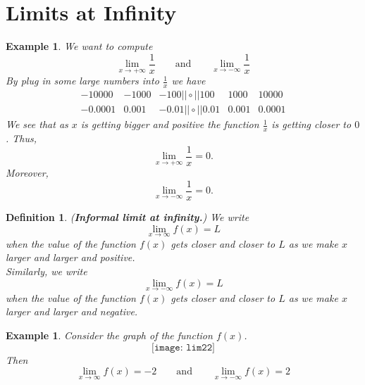 \documentclass[12pt,a4paper]{book}
\newtheorem{Example}[theorem]{Example}
\numberwithin{equation}{section}
\newtheorem*{definition}{Definition}
\begin{document}
\section{Limits at Infinity} 
\begin{Example}
	We want to compute 
	$$\lim_{x\to +\infty} \frac{1}{x} \quad \quad \text{and}\quad \quad \lim_{x\to -\infty} \frac{1}{x}$$ By plug in some large numbers into $\frac{1}{x}$ we have
$$	\begin{array}{c|c|c|c|c|c|c}
		-10000&-1000 & -100 ||\circ || 100 & 1000& 10000\\
		\hline
		-0.0001& 0.001 & -0.01  ||\circ || 0.01 & 0.001& 0.0001
	\end{array}
	$$
	We see that as $x$ is getting bigger and  positive the function $\frac{1}{x}$ is getting closer to  $0$. Thus, 
	$$\lim_{x\to +\infty} \frac{1}{x}=0.$$ Moreover,
	$$\lim_{x\to -\infty} \frac{1}{x}=0.$$
\end{Example}

\begin{definition}({\bf Informal limit at infinity.})
	We write 
	$$\lim_{x\to \infty} f(x)=L$$ when the value of the function $f(x)$ gets closer and closer to $L$ as we make $x$ larger and larger and positive.\\
	Similarly, we write 
	$$\lim_{x\to -\infty}f(x)=L$$ when the value of the function $f(x)$ gets closer and closer to $L$ as we make $x$ larger and larger and negative.
\end{definition}

\begin{Example}
	Consider the graph of the function $f(x)$. 
		$$
	\texttt{[image: lim22]}
	$$
	Then 
	$$\lim_{x\to \infty} f(x)=-2\quad \quad \text{and}\quad \quad \lim_{x\to -\infty} f(x)=2$$ 
\end{Example}
\end{document}
